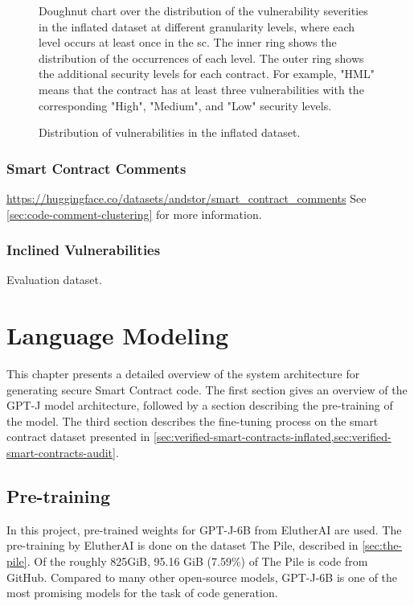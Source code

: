 \begin{figure}[htbp]
    \centering
    
    \caption{Doughnut chart over the distribution of the vulnerability severities in the inflated dataset at different granularity levels, where each level occurs at least once in the \acrshort{sc}. The inner ring shows the distribution of the occurrences of each level. The outer ring shows the additional security levels for each contract. For example, "HML" means that the contract has at least three vulnerabilities with the corresponding "High", "Medium", and "Low" security levels.}
\end{figure}


\begin{figure}[htbp]
    \centering
    
    \caption{Distribution of vulnerabilities in the inflated dataset.}
\end{figure}

\subsubsection{Smart Contract Comments}
\label{sec:verified-smart-contracts-comments}

\url{https://huggingface.co/datasets/andstor/smart_contract_comments}
See \cref{sec:code-comment-clustering} for more information.

\subsubsection{Inclined Vulnerabilities}
\label{sec:inclined-vulnerabilities}

Evaluation dataset.


\section{Language Modeling}
\label{sec:language-modeling}
This chapter presents a detailed overview of the system architecture for generating secure Smart Contract code. The first section gives an overview of the GPT-J model architecture, followed by a section describing the pre-training of the model. The third section describes the fine-tuning process on the smart contract dataset presented in \cref{sec:verified-smart-contracts-inflated,sec:verified-smart-contracts-audit}. 


\subsection{Pre-training}
\label{sec:pretraining}
In this project, pre-trained weights for GPT-J-6B from ElutherAI are used. The pre-training by ElutherAI is done on the dataset The Pile, described in \cref{sec:the-pile}. Of the roughly 825GiB, 95.16 GiB (7.59\%) of The Pile is code from GitHub. Compared to many other open-source models, GPT-J-6B is one of the most promising models for the task of code generation.

